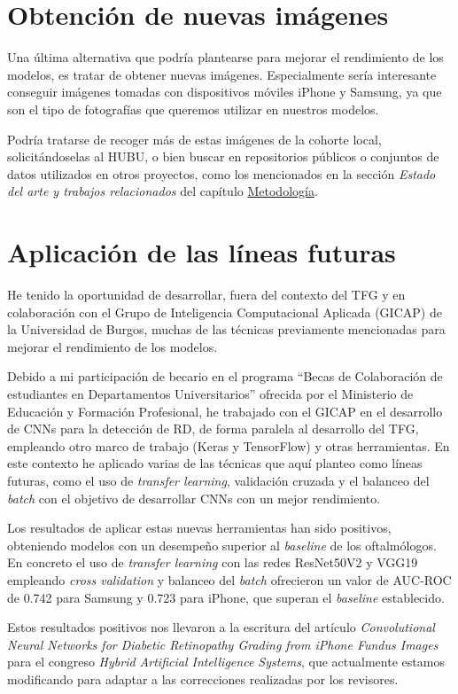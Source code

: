 \section{Obtención de nuevas imágenes}

Una última alternativa que podría plantearse para mejorar el rendimiento de los modelos, es tratar de obtener nuevas imágenes. Especialmente sería interesante conseguir imágenes tomadas con dispositivos móviles iPhone y Samsung, ya que son el tipo de fotografías que queremos utilizar en nuestros modelos.

Podría tratarse de recoger más de estas imágenes de la cohorte local, solicitándoselas al HUBU, o bien buscar en repositorios públicos o conjuntos de datos utilizados en otros proyectos, como los mencionados en la sección \textit{Estado del arte y trabajos relacionados} del capítulo \hyperref[Met]{Metodología}.

\section{Aplicación de las líneas futuras}

He tenido la oportunidad de desarrollar, fuera del contexto del TFG y en colaboración con el Grupo de Inteligencia Computacional Aplicada (GICAP) de la Universidad de Burgos, muchas de las técnicas previamente mencionadas para mejorar el rendimiento de los modelos. 

Debido a mi participación de becario en el programa ``Becas de Colaboración de estudiantes en Departamentos Universitarios'' ofrecida por el Ministerio de Educación y Formación Profesional, he trabajado con el GICAP en el desarrollo de CNNs para la detección de RD, de forma paralela al desarrollo del TFG, empleando otro marco de trabajo (Keras y TensorFlow) y otras herramientas. En este contexto he aplicado varias de las técnicas que aquí planteo como líneas futuras, como el uso de \textit{transfer learning}, validación cruzada y el balanceo del \textit{batch} con el objetivo de desarrollar CNNs con un mejor rendimiento.

Los resultados de aplicar estas nuevas herramientas han sido positivos, obteniendo modelos con un desempeño superior al \textit{baseline} de los oftalmólogos. En concreto el uso de \textit{transfer learning} con las redes ResNet50V2 y VGG19 empleando \textit{cross validation} y balanceo del \textit{batch} ofrecieron un valor de AUC-ROC de 0.742 para Samsung y 0.723 para iPhone, que superan el \textit{baseline} establecido.

Estos resultados positivos nos llevaron a la escritura del artículo \textit{Convolutional Neural Networks for Diabetic Retinopathy Grading from iPhone Fundus Images} para el congreso \textit{Hybrid Artificial Intelligence Systems}, que actualmente estamos modificando para adaptar a las correcciones realizadas por los revisores.